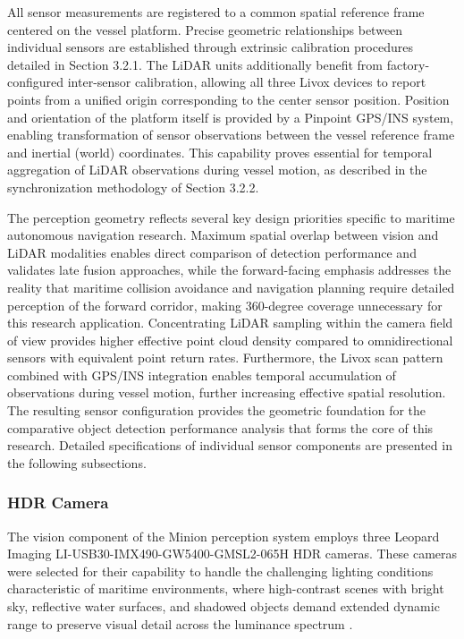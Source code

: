 \documentclass{erauthesis}
\begin{document}
All sensor measurements are registered to a common spatial reference frame centered on the vessel platform.
Precise geometric relationships between individual sensors are established through extrinsic calibration procedures detailed in Section 3.2.1.
The \ac{LiDAR} units additionally benefit from factory-configured inter-sensor calibration, allowing all three Livox devices to report points from a unified origin corresponding to the center sensor position.
Position and orientation of the platform itself is provided by a Pinpoint \ac{GPS}/\ac{INS} system, enabling transformation of sensor observations between the vessel reference frame and inertial (world) coordinates.
This capability proves essential for temporal aggregation of \ac{LiDAR} observations during vessel motion, as described in the synchronization methodology of Section 3.2.2.

The perception geometry reflects several key design priorities specific to maritime autonomous navigation research.
Maximum spatial overlap between vision and \ac{LiDAR} modalities enables direct comparison of detection performance and validates late fusion approaches, while the forward-facing emphasis addresses the reality that maritime collision avoidance and navigation planning require detailed perception of the forward corridor, making 360-degree coverage unnecessary for this research application.
Concentrating \ac{LiDAR} sampling within the camera field of view provides higher effective point cloud density compared to omnidirectional sensors with equivalent point return rates.
Furthermore, the Livox scan pattern combined with \ac{GPS}/\ac{INS} integration enables temporal accumulation of observations during vessel motion, further increasing effective spatial resolution.
The resulting sensor configuration provides the geometric foundation for the comparative object detection performance analysis that forms the core of this research.
Detailed specifications of individual sensor components are presented in the following subsections.

            \subsubsection{HDR Camera}

The vision component of the Minion perception system employs three Leopard Imaging LI-USB30-IMX490-GW5400-GMSL2-065H \ac{HDR} cameras.
These cameras were selected for their capability to handle the challenging lighting conditions characteristic of maritime environments, where high-contrast scenes with bright sky, reflective water surfaces, and shadowed objects demand extended dynamic range to preserve visual detail across the luminance spectrum \cite{thompson2023}.
\end{document}
